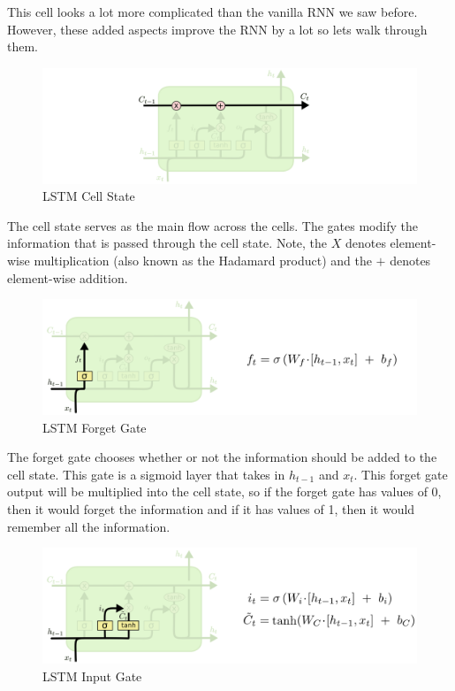 \documentclass{article}
\begin{document}
This cell looks a lot more complicated than the vanilla RNN we saw before. However, these added aspects improve the RNN by a lot so lets walk through them.

\begin{figure}[H]
\centering
\includegraphics[scale=0.5]{lstm/lstm_cellstate.png}
\caption{LSTM Cell State}
\label{fig:lstm_cellstate}
\end{figure}

The cell state serves as the main flow across the cells. The gates modify the information that is passed through the cell state. Note, the $X$ denotes element-wise multiplication (also known as the Hadamard product) and the $+$ denotes element-wise addition.


\begin{figure}[H]
\centering
\includegraphics[scale=0.5]{lstm/lstm_forget.png}
\caption{LSTM Forget Gate}
\label{fig:lstm_forget}
\end{figure}

The forget gate chooses whether or not the information should be added to the cell state. This gate is a sigmoid layer that takes in $h_{t-1}$ and $x_{t}$. This forget gate output will be multiplied into the cell state, so if the forget gate has values of 0, then it would forget the information and if it has values of 1, then it would remember all the information.

\begin{figure}[H]
\centering
\includegraphics[scale=0.5]{lstm/lstm_input.png}
\caption{LSTM Input Gate}
\label{fig:lstm_input}
\end{figure}
\end{document}
